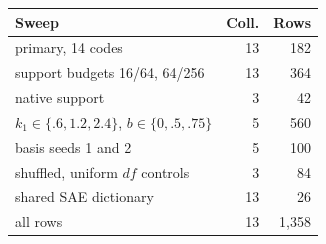\begin{tabular}{@{}lrr@{}}
\toprule
Sweep & Coll. & Rows \\
\midrule
primary, 14 codes & 13 & 182 \\
support budgets 16/64, 64/256 & 13 & 364 \\
native support & 3 & 42 \\
$k_1 \in \{.6, 1.2, 2.4\}$, $b \in \{0, .5, .75\}$ & 5 & 560 \\
basis seeds 1 and 2 & 5 & 100 \\
shuffled, uniform $df$ controls & 3 & 84 \\
shared SAE dictionary & 13 & 26 \\
\midrule
all rows & 13 & 1{,}358 \\
\bottomrule
\end{tabular}
